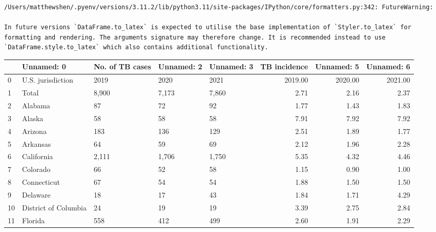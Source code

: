 \documentclass[
  letterpaper,
  DIV=11,
  numbers=noendperiod]{scrreprt}
\begin{document}
\begin{verbatim}
/Users/matthewshen/.pyenv/versions/3.11.2/lib/python3.11/site-packages/IPython/core/formatters.py:342: FutureWarning:

In future versions `DataFrame.to_latex` is expected to utilise the base implementation of `Styler.to_latex` for formatting and rendering. The arguments signature may therefore change. It is recommended instead to use `DataFrame.style.to_latex` which also contains additional functionality.
\end{verbatim}

\begin{tabular}{lllllrrr}
\toprule
{} &            Unnamed: 0 & No. of TB cases & Unnamed: 2 & Unnamed: 3 &  TB incidence &  Unnamed: 5 &  Unnamed: 6 \\
\midrule
0  &     U.S. jurisdiction &            2019 &       2020 &       2021 &       2019.00 &     2020.00 &     2021.00 \\
1  &                 Total &           8,900 &      7,173 &      7,860 &          2.71 &        2.16 &        2.37 \\
2  &               Alabama &              87 &         72 &         92 &          1.77 &        1.43 &        1.83 \\
3  &                Alaska &              58 &         58 &         58 &          7.91 &        7.92 &        7.92 \\
4  &               Arizona &             183 &        136 &        129 &          2.51 &        1.89 &        1.77 \\
5  &              Arkansas &              64 &         59 &         69 &          2.12 &        1.96 &        2.28 \\
6  &            California &           2,111 &      1,706 &      1,750 &          5.35 &        4.32 &        4.46 \\
7  &              Colorado &              66 &         52 &         58 &          1.15 &        0.90 &        1.00 \\
8  &           Connecticut &              67 &         54 &         54 &          1.88 &        1.50 &        1.50 \\
9  &              Delaware &              18 &         17 &         43 &          1.84 &        1.71 &        4.29 \\
10 &  District of Columbia &              24 &         19 &         19 &          3.39 &        2.75 &        2.84 \\
11 &               Florida &             558 &        412 &        499 &          2.60 &        1.91 &        2.29 \\

\end{tabular}
\end{document}
